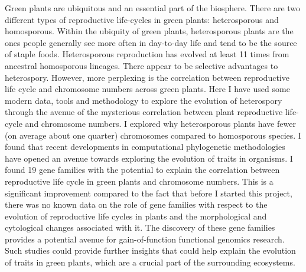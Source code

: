\doublespacing
Green plants are ubiquitous and an essential part of the biosphere. There are two different types of reproductive life-cycles in green plants: heterosporous and homosporous. Within the ubiquity of green plants, heterosporous plants are the ones people generally see more often in day-to-day life and tend to be the source of staple foods. Heterosporous reproduction has evolved at least 11 times from ancestral homosporous lineages. There appear to be selective advantages to heterospory. However, more perplexing is the correlation between reproductive life cycle and chromosome numbers across green plants. Here I have used some modern data, tools and methodology to explore the evolution of heterospory through the avenue of the mysterious correlation between plant reproductive life-cycle and chromosome numbers. I explored why heterosporous plants have fewer (on average about one quarter) chromosomes compared to homosporous species.  I found that recent developments in computational phylogenetic methodologies have opened an avenue towards exploring the evolution of traits in organisms. I found 19 gene families with the potential to explain the correlation between reproductive life cycle in green plants and chromosome numbers. This is a significant improvement compared to the fact that before I started this project, there was no known data on the role of gene families with respect to the evolution of reproductive life cycles in plants and the morphological and cytological changes associated with it. The discovery of these gene families provides a potential avenue for gain-of-function functional genomics research. Such studies could provide further insights that could help explain the evolution of traits in green plants, which are a crucial part of the surrounding ecosystems.
\clearpage

